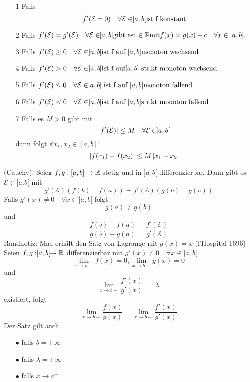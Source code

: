 \begin{enumerate}
    \item [1] Falls \[f'(\mathcal{E} = 0) \quad \forall \mathcal{E} \in ]a,b[ \\ \text{ist f konstant}\]
    \item [2] Falls \(f'(\mathcal{E}) = g'(\mathcal{E}) \quad \forall \mathcal{E} \in ]a,b[ \\ \text{gibt es} c \in \mathbb{R} \text{mit} f(x) = g(x) + c \quad \forall x \in [a,b].\)
    \item [3] Falls \(f'(\mathcal{E}) \geq 0 \quad \forall \mathcal{E} \in ]a,b[ \\ \text{ist f auf } [a,b] \text{monoton wachsend}\)
    \item [4] Falls \(f'(\mathcal{E}) > 0 \quad \forall \mathcal{E} \in ]a,b[ \\ \text{ist f auf} [a,b] \text{ strikt monoton wachsend}\)
    \item [5] Falls \(f'(\mathcal{E}) \leq 0 \quad \forall \mathcal{E} \in ]a,b[ \\\text{ ist f auf } [a,b] \text{monoton fallend}\)
    \item [6] Falls \(f'(\mathcal{E}) < 0 \quad \forall \mathcal{E} \in ]a,b[ \\ \text{ist f auf } [a,b] \text{strikt monoton fallend}\)
    \item [7] Falls es \(M > 0 \) gibt mit
    \[\left\lvert f'(\mathcal{E}) \right\rvert \leq M \quad \forall \mathcal{E} \in ]a,b[\]
    dann folgt \( \forall x_1, x_2 \in [a,b] : \)
    \[\left\lvert f(x_1) - f(x_2) \right\rvert \leq M \left\lvert x_1 - x_2 \right\rvert\]
\end{enumerate}
 (Cauchy). Seien \(f,g : [a,b] \rightarrow \mathbb{R} \) stetig und in \(]a,b[\) differenzierbar. Dann gibt es \( \mathcal{E} \in ]a.b[ \) mit 
\[ g'(\mathcal{E}) (f(b) - f(a)) = f'(\mathcal{E}) (g(b) - g(a))\]
Falls \(g'(x) \neq 0 \quad \forall x \in ]a,b[ \) folgt
\[g(a) \neq g(b)\]
und
\[\frac{f(b) - f(a)}{g(b) - g(a) } = \frac{f'(\mathcal{E})}{g'(\mathcal{E})}\]
Randnotiz: Man erhält den Satz von Lagrange mit \(g(x) = x\)
 (l'Hospital 1696) Seien \(f,g : ]a,b[ \rightarrow \mathbb{R} \) differenzierbar mit \(g'(x) \neq 0 \quad \forall x \in ]a,b[\)
\[ \lim\limits_{x \rightarrow b-}f(x) = 0, \lim\limits_{x \rightarrow b-} g(x) = 0\]
und
\[ \lim\limits_{x \rightarrow b-} \frac{f'(x)}{g'(x)} =: \lambda\]
existiert, folgt
\[ \lim\limits_{x \rightarrow b-} \frac{f(x)}{g(x)} = \lim\limits_{x \rightarrow b-} \frac{f'(x)}{g'(x)}\]
 Der Satz gilt auch 
\begin{enumerate}
    \item [$\bullet$] falls \(b = + \infty\)
    \item [$\bullet$] falls \( \lambda = + \infty\)
    \item [$\bullet$] falls \( x \rightarrow a^{+}\)
\end{enumerate}
